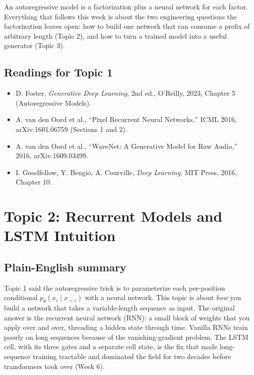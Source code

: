 \documentclass[11pt]{article}
\theoremstyle{remark}
\begin{document}
An autoregressive model is a factorization plus a neural network for each factor. Everything that follows this week is about the two engineering questions the factorization leaves open: how to build one network that can consume a prefix of arbitrary length (Topic 2), and how to turn a trained model into a useful generator (Topic 3).

\subsection*{Readings for Topic 1}
\begin{itemize}[nosep]\raggedright
\item D. Foster, \emph{Generative Deep Learning}, 2nd ed., O'Reilly, 2023, Chapter 5 (Autoregressive Models).
\item A. van den Oord et al., ``Pixel Recurrent Neural Networks,'' ICML 2016, arXiv:1601.06759 (Sections 1 and 2).
\item A. van den Oord et al., ``WaveNet: A Generative Model for Raw Audio,'' 2016, arXiv:1609.03499.
\item I. Goodfellow, Y. Bengio, A. Courville, \emph{Deep Learning}, MIT Press, 2016, Chapter 10.
\end{itemize}

\clearpage
\section{Topic 2: Recurrent Models and LSTM Intuition}

\subsection{Plain-English summary}

Topic 1 said the autoregressive trick is to parameterize each per-position conditional $p_\theta(x_i \mid x_{<i})$ with a neural network. This topic is about \emph{how} you build a network that takes a variable-length sequence as input. The original answer is the recurrent neural network (RNN): a small block of weights that you apply over and over, threading a hidden state through time. Vanilla RNNs train poorly on long sequences because of the vanishing-gradient problem. The LSTM cell, with its three gates and a separate cell state, is the fix that made long-sequence training tractable and dominated the field for two decades before transformers took over (Week 6).
\end{document}
